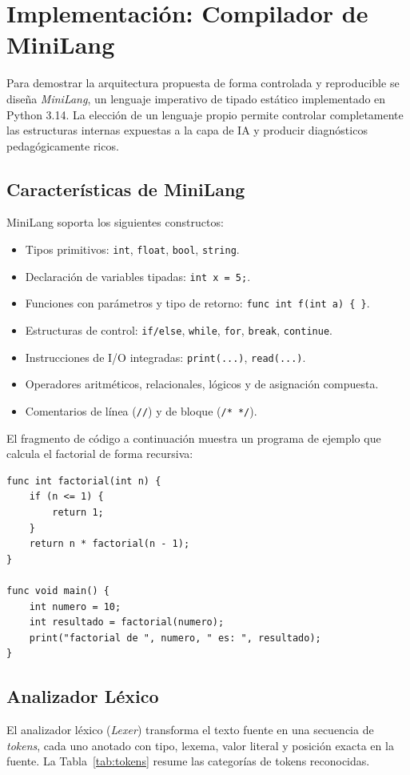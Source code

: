 \documentclass[conference]{IEEEtran}
\begin{document}
\section{Implementación: Compilador de MiniLang}
Para demostrar la arquitectura propuesta de forma controlada y reproducible se diseña \textit{MiniLang}, un lenguaje imperativo de tipado estático implementado en Python 3.14. La elección de un lenguaje propio permite controlar completamente las estructuras internas expuestas a la capa de IA y producir diagnósticos pedagógicamente ricos.

\subsection{Características de MiniLang}
MiniLang soporta los siguientes constructos:
\begin{itemize}
    \item Tipos primitivos: \texttt{int}, \texttt{float}, \texttt{bool}, \texttt{string}.
    \item Declaración de variables tipadas: \texttt{int x = 5;}.
    \item Funciones con parámetros y tipo de retorno: \texttt{func int f(int a)~\{~\}}.
    \item Estructuras de control: \texttt{if/else}, \texttt{while}, \texttt{for}, \texttt{break}, \texttt{continue}.
    \item Instrucciones de I/O integradas: \texttt{print(...)}, \texttt{read(...)}.
    \item Operadores aritméticos, relacionales, lógicos y de asignación compuesta.
    \item Comentarios de línea (\texttt{//}) y de bloque (\texttt{/* */}).
\end{itemize}

El fragmento de código a continuación muestra un programa de ejemplo que calcula el factorial de forma recursiva:

\begin{lstlisting}[language=MiniLang, caption={factorial.ml -- programa de prueba en MiniLang}]
func int factorial(int n) {
    if (n <= 1) {
        return 1;
    }
    return n * factorial(n - 1);
}

func void main() {
    int numero = 10;
    int resultado = factorial(numero);
    print("factorial de ", numero, " es: ", resultado);
}
\end{lstlisting}

\subsection{Analizador Léxico}
El analizador léxico (\textit{Lexer}) transforma el texto fuente en una secuencia de \textit{tokens}, cada uno anotado con tipo, lexema, valor literal y posición exacta en la fuente. La Tabla~\ref{tab:tokens} resume las categorías de tokens reconocidas.
\end{document}
